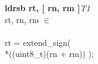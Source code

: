 


\begin{instructionblock}{\imagewidth}%
    \textbf{ldrsb rt, [ rn, rm ]}\hfill\textit{T1}\\
    rt, rn, rm $\in$ \baseregisters\\
    \\
    rt = extend\_sign(\\
    *((uint8\_t)(rn + rm)) );
\end{instructionblock}

